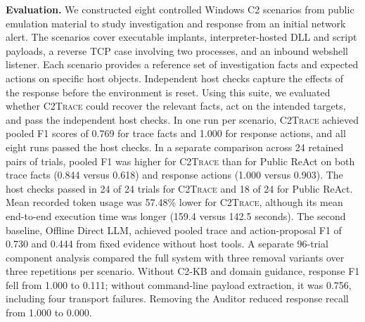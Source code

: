 \documentclass[pdflatex,sn-basic]{sn-jnl}
\newcommand{\system}{\textsc{C2Trace}\xspace}
\begin{document}
\noindent\textbf{Evaluation.} We constructed eight controlled Windows C2 scenarios from public emulation material to study investigation and response from an initial network alert. The scenarios cover executable implants, interpreter-hosted DLL and script payloads, a reverse TCP case involving two processes, and an inbound webshell listener. Each scenario provides a reference set of investigation facts and expected actions on specific host objects. Independent host checks capture the effects of the response before the environment is reset. Using this suite, we evaluated whether \system could recover the relevant facts, act on the intended targets, and pass the independent host checks. In one run per scenario, \system achieved pooled F1 scores of 0.769 for trace facts and 1.000 for response actions, and all eight runs passed the host checks. In a separate comparison across 24 retained pairs of trials, pooled F1 was higher for \system than for Public ReAct on both trace facts (0.844 versus 0.618) and response actions (1.000 versus 0.903). The host checks passed in 24 of 24 trials for \system and 18 of 24 for Public ReAct. Mean recorded token usage was 57.48\% lower for \system, although its mean end-to-end execution time was longer (159.4 versus 142.5 seconds). The second baseline, Offline Direct LLM, achieved pooled trace and action-proposal F1 of 0.730 and 0.444 from fixed evidence without host tools. A separate 96-trial component analysis compared the full system with three removal variants over three repetitions per scenario. Without C2-KB and domain guidance, response F1 fell from 1.000 to 0.111; without command-line payload extraction, it was 0.756, including four transport failures. Removing the Auditor reduced response recall from 1.000 to 0.000.
\end{document}
